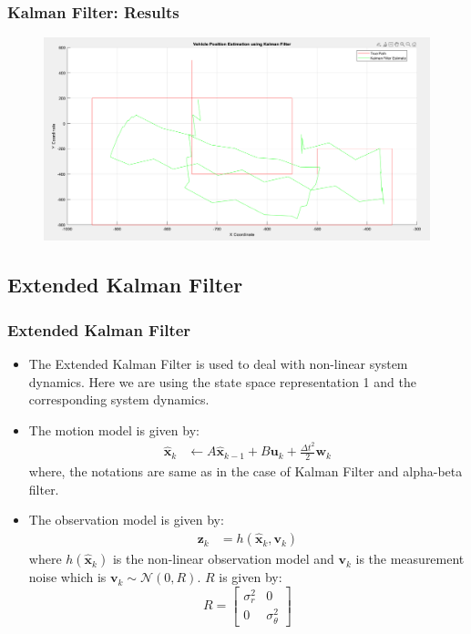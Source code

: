 \documentclass{beamer}
\begin{document}
\begin{frame}
\frametitle{Kalman Filter: Results}
\begin{figure}
\includegraphics[width=0.8\linewidth]{kalman.png}
\end{figure}
\end{frame}

\subsection{Extended Kalman Filter}
\begin{frame}
\frametitle{Extended Kalman Filter}
\begin{itemize}
    \item The Extended Kalman Filter is used to deal with non-linear system dynamics. Here we are using the state space representation 1 and the corresponding system dynamics.
    \item The motion model is given by:
    \begin{align*}
        \hat{\mathbf{x}}_k &\leftarrow A \hat{\mathbf{x}}_{k-1} + B \mathbf{u}_k + \frac{\Delta t^2}{2}\mathbf{w}_k
    \end{align*}
    where, the notations are same as in the case of Kalman Filter and alpha-beta filter.
    \item The observation model is given by:
    \begin{align*}
        \mathbf{z}_k &= h(\hat{\mathbf{x}}_k, \mathbf{v}_k)
    \end{align*}
    where $h(\hat{\mathbf{x}}_k)$ is the non-linear observation model and $\mathbf{v}_k$ is the measurement noise which is $\mathbf{v}_k \sim \mathcal{N}(0, R)$. $R$ is given by:
    \begin{equation*}
        R = \begin{bmatrix}
            \sigma^2_r & 0 \\
            0 & \sigma^2_{\theta}
        \end{bmatrix}
    \end{equation*}
\end{itemize}
\end{frame}
\end{document}
